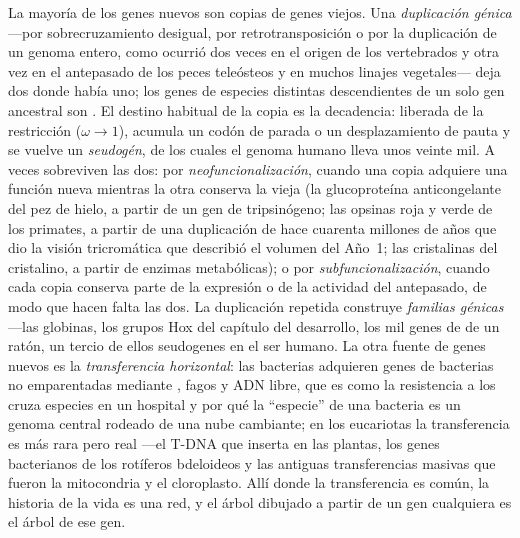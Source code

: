 \begin{definition}\label{def:b3:molecular-evolution:duplication}
La mayoría de los genes nuevos son copias de genes viejos. Una
\emph{duplicación génica} ---por sobrecruzamiento desigual, por
retrotransposición o por la duplicación de un genoma entero, como
ocurrió dos veces en el origen de los vertebrados y otra vez en el
antepasado de los peces teleósteos y en muchos linajes vegetales---
deja dos  donde había uno; los genes de especies
distintas descendientes de un solo gen ancestral son .
El destino habitual de la copia es la decadencia: liberada de la
restricción ($\omega \to 1$), acumula un codón de parada o un
desplazamiento de pauta y se vuelve un \emph{seudogén}, de los cuales el
genoma humano lleva unos veinte mil. A veces sobreviven las dos: por
\emph{neofuncionalización}, cuando una copia adquiere una función nueva
mientras la otra conserva la vieja (la glucoproteína anticongelante del
pez de hielo, a partir de un gen de tripsinógeno; las opsinas roja y
verde de los primates, a partir de una duplicación de hace cuarenta
millones de años que dio la visión tricromática que describió el
volumen del Año~1; las cristalinas del cristalino, a partir de enzimas
metabólicas); o por \emph{subfuncionalización}, cuando cada copia
conserva parte de la expresión o de la actividad del antepasado, de modo
que hacen falta las dos. La duplicación repetida construye
\emph{familias génicas} ---las globinas, los grupos Hox del capítulo del
desarrollo, los mil genes de  de un ratón, un tercio
de ellos seudogenes en el ser humano. La otra fuente de genes nuevos es
la \emph{transferencia horizontal}: las bacterias adquieren genes de
bacterias no emparentadas mediante , fagos y ADN libre, que es
como la resistencia a los  cruza especies en un hospital y
por qué la ``especie'' de una bacteria es un genoma central rodeado de
una nube cambiante; en los eucariotas la transferencia es más rara pero
real ---el T-DNA que \emph{} inserta en las plantas, los
genes bacterianos de los rotíferos bdeloideos y las antiguas
transferencias masivas que fueron la mitocondria y el cloroplasto. Allí
donde la transferencia es común, la historia de la vida es una red, y
el árbol dibujado a partir de un gen cualquiera es el árbol de ese gen.
\end{definition}

